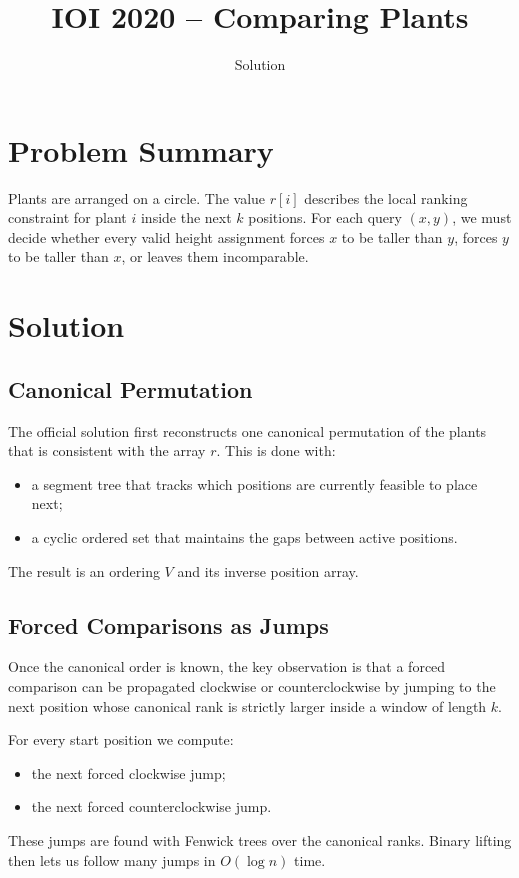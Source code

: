 \documentclass[11pt,a4paper]{article}
\title{IOI 2020 -- Comparing Plants}
\author{Solution}
\date{}
\begin{document}
\maketitle

\section{Problem Summary}
Plants are arranged on a circle. The value $r[i]$ describes the local ranking constraint for plant $i$ inside the next $k$ positions. For each query $(x,y)$, we must decide whether every valid height assignment forces $x$ to be taller than $y$, forces $y$ to be taller than $x$, or leaves them incomparable.

\section{Solution}

\subsection{Canonical Permutation}
The official solution first reconstructs one canonical permutation of the plants that is consistent with the array $r$. This is done with:
\begin{itemize}
  \item a segment tree that tracks which positions are currently feasible to place next;
  \item a cyclic ordered set that maintains the gaps between active positions.
\end{itemize}
The result is an ordering $V$ and its inverse position array.

\subsection{Forced Comparisons as Jumps}
Once the canonical order is known, the key observation is that a forced comparison can be propagated clockwise or counterclockwise by jumping to the next position whose canonical rank is strictly larger inside a window of length $k$.

For every start position we compute:
\begin{itemize}
  \item the next forced clockwise jump;
  \item the next forced counterclockwise jump.
\end{itemize}
These jumps are found with Fenwick trees over the canonical ranks. Binary lifting then lets us follow many jumps in $O(\log n)$ time.
\end{document}
